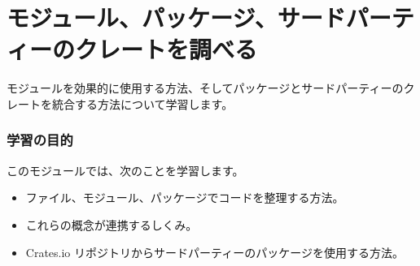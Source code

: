 \section{モジュール、パッケージ、サードパーティーのクレートを調べる}

モジュールを効果的に使用する方法、そしてパッケージとサードパーティーのクレートを統合する方法について学習します。

\subsubsection{学習の目的}

このモジュールでは、次のことを学習します。

\begin{itemize}
\item ファイル、モジュール、パッケージでコードを整理する方法。
\item これらの概念が連携するしくみ。
\item Crates.io リポジトリからサードパーティーのパッケージを使用する方法。
\end{itemize}

